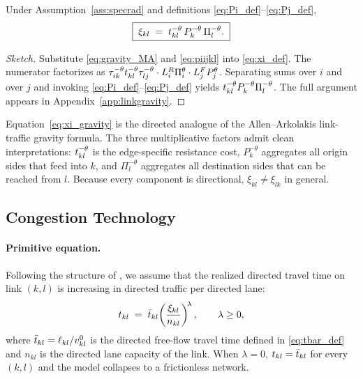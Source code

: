\begin{proposition}\label{prop:linkgravity}
Under Assumption~\ref{ass:specrad} and definitions
\eqref{eq:Pi_def}--\eqref{eq:Pj_def},
\begin{equation}
  \boxed{\;\xi_{kl}\;=\;t_{kl}^{-\theta}\,P_k^{-\theta}\,\Pi_l^{-\theta}.\;}
  \label{eq:xi_gravity}
\end{equation}
\end{proposition}
\begin{proof}[Sketch]
Substitute \eqref{eq:gravity_MA} and \eqref{eq:piijkl} into
\eqref{eq:xi_def}.  The numerator factorizes as
$\tau_{ik}^{-\theta}t_{kl}^{-\theta}\tau_{lj}^{-\theta}\cdot
L_i^R\Pi_i^{\theta}\cdot L_j^F P_j^{\theta}$.  Separating sums over
$i$ and over $j$ and invoking \eqref{eq:Pi_def}--\eqref{eq:Pj_def}
yields $t_{kl}^{-\theta}P_k^{-\theta}\Pi_l^{-\theta}$.  The full
argument appears in Appendix~\ref{app:linkgravity}.
\end{proof}

\begin{remark}[Interpretation]
Equation~\eqref{eq:xi_gravity} is the directed analogue of the
Allen--Arkolakis link-traffic gravity formula.  The three multiplicative
factors admit clean interpretations: $t_{kl}^{-\theta}$ is the
edge-specific resistance cost, $P_k^{-\theta}$ aggregates all origin
sides that feed into $k$, and $\Pi_l^{-\theta}$ aggregates all
destination sides that can be reached from $l$.  Because every
component is directional, $\xi_{kl}\ne\xi_{lk}$ in general.
\end{remark}

\subsection{Congestion Technology}\label{ssec:cong}

\paragraph{Primitive equation.}
Following the structure of \cite{AllenArkolakis2022}, we assume that
the realized directed travel time on link $(k,l)$ is increasing in
directed traffic per directed lane:
\begin{equation}
  t_{kl}
  \;=\;
  \bar t_{kl}\!\left(\frac{\xi_{kl}}{n_{kl}}\right)^{\!\lambda},
  \qquad \lambda\ge 0,
  \label{eq:cong_primitive}
\end{equation}
where $\bar t_{kl}=\ell_{kl}/v^{0}_{kl}$ is the directed free-flow
travel time defined in \eqref{eq:tbar_def} and $n_{kl}$ is the
directed lane capacity of the link.  When $\lambda=0$, $t_{kl}=\bar t_{kl}$
for every $(k,l)$ and the model collapses to a frictionless
network.

